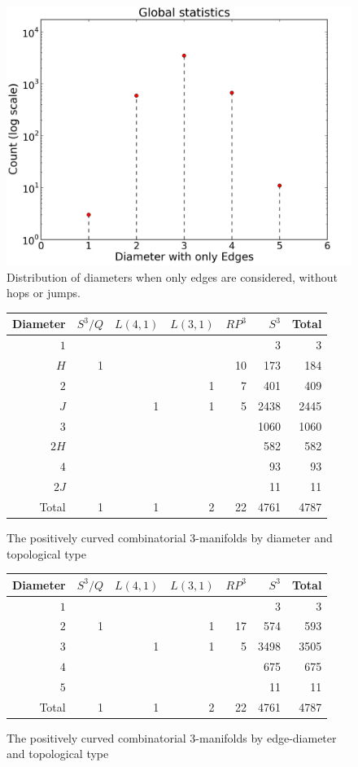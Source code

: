 \documentclass[12pt]{article}
\begin{document}
\begin{figure}
    \begin{center}
    \includegraphics[width=0.6\linewidth]{figures/edge_diameters.png}
    \end{center}
    \caption{Distribution of diameters when only edges are considered, without hops or jumps.}
    \label{fig:global_statistics_edges}
\end{figure}

\begin{figure}
\centering
\begin{tabular} {| r | r | r | r | r | r | r |}
\hline
Diameter & $S^{3}/Q$ & $L(4,1)$ & $L(3,1)$ & $RP^{3}$ & $S^{3}$ & Total \\
\hline
\hline
$1$&  &  &  &   &3    & 3    \\
$H$&1 &  &  &10 &173  & 184  \\
$2$&  &  &1 &7  &401  & 409  \\
$J$&  &1 &1 &5  &2438 & 2445 \\
$3$&  &  &  &   &1060 & 1060 \\
$2H$&  &  &  &   &582  & 582  \\
$4$&  &  &  &   &93   & 93   \\
$2J$&  &  &  &   &11   & 11   \\
\hline
Total&1 &1 &2 &22   &4761   &4787  \\
\hline
\end{tabular}
\caption{The positively curved combinatorial 3-manifolds by diameter and topological type}
\label{fig:manifold_counts}
\end{figure}

\begin{figure}
\centering
\begin{tabular} {| r | r | r | r | r | r | r |}	
\hline
Diameter & $S^{3}/Q$ & $L(4,1)$ & $L(3,1)$ & $RP^{3}$ & $S^{3}$ & Total \\
\hline
\hline
$1$ &  &  &  &   &3    & 3    \\
$2$ & 1&  &1 &17 &574  & 593  \\
$3$ &  &1 &1 &5  &3498 & 3505 \\
$4$ &  &  &  &   &675  & 675   \\
$5$ &  &  &  &   &11   & 11   \\
\hline
Total&1 &1 &2 &22   &4761   &4787  \\
\hline
\end{tabular}
\caption{The positively curved combinatorial 3-manifolds by edge-diameter and topological type}
\label{fig:manifold_counts_edges}
\end{figure}
\end{document}
